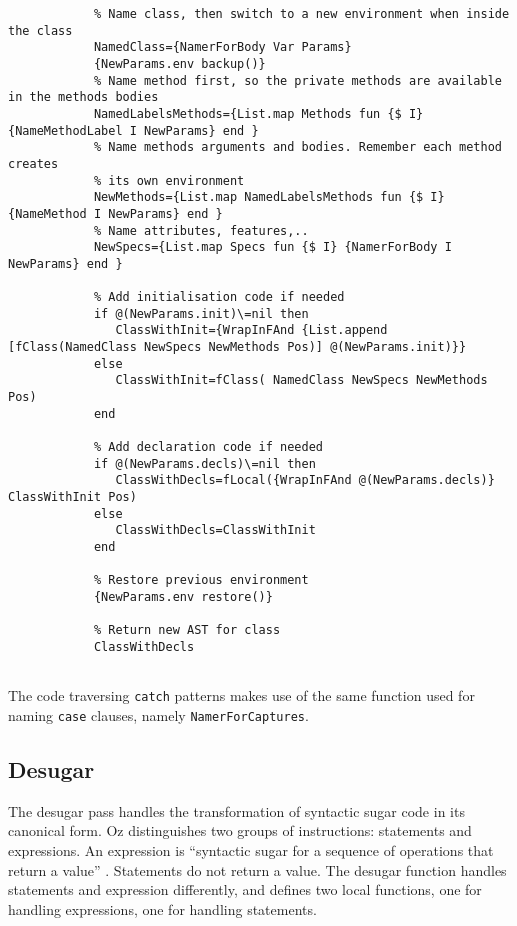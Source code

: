 \documentclass[a4paper]{memoir}
\begin{document}
\begin{lstlisting}
            % Name class, then switch to a new environment when inside the class
            NamedClass={NamerForBody Var Params}
            {NewParams.env backup()}
            % Name method first, so the private methods are available in the methods bodies
            NamedLabelsMethods={List.map Methods fun {$ I} {NameMethodLabel I NewParams} end }
            % Name methods arguments and bodies. Remember each method creates
            % its own environment
            NewMethods={List.map NamedLabelsMethods fun {$ I} {NameMethod I NewParams} end }
            % Name attributes, features,..
            NewSpecs={List.map Specs fun {$ I} {NamerForBody I NewParams} end }

            % Add initialisation code if needed
            if @(NewParams.init)\=nil then
               ClassWithInit={WrapInFAnd {List.append [fClass(NamedClass NewSpecs NewMethods Pos)] @(NewParams.init)}}
            else
               ClassWithInit=fClass( NamedClass NewSpecs NewMethods Pos)
            end

            % Add declaration code if needed
            if @(NewParams.decls)\=nil then
               ClassWithDecls=fLocal({WrapInFAnd @(NewParams.decls)} ClassWithInit Pos)
            else
               ClassWithDecls=ClassWithInit
            end

            % Restore previous environment
            {NewParams.env restore()}

            % Return new AST for class
            ClassWithDecls
  
\end{lstlisting}

The code traversing \lstinline!catch! patterns makes use of the same
function used for naming \lstinline!case! clauses, namely
\lstinline!NamerForCaptures!.



\subsection{Desugar}\label{sec:arch:desugar}
The desugar pass handles the transformation of syntactic sugar code in its canonical form.
Oz distinguishes two groups of instructions: statements and expressions. An expression is ``syntactic sugar for a sequence of operations that return a value'' . Statements do not return a value.
The desugar function handles statements and expression differently, and defines two local functions, one for handling expressions, one for handling statements.
\end{document}
